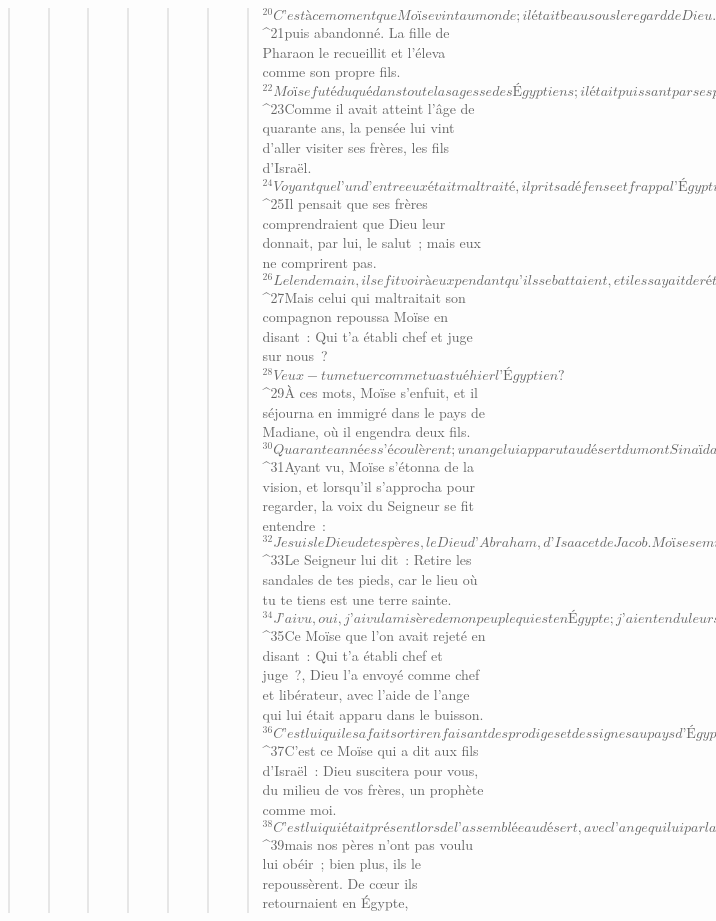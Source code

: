 \begin{verse}
\begin{verse}
\begin{verse}
\begin{verse}
\begin{verse}
\begin{verse}
\begin{verse}
${}^{20}C’est à ce moment que Moïse vint au monde ; il était beau sous le regard de Dieu. Il fut élevé pendant trois mois dans la maison de son père, 
${}^{21}puis abandonné. La fille de Pharaon le recueillit et l’éleva comme son propre fils. 
${}^{22}Moïse fut éduqué dans toute la sagesse des Égyptiens ; il était puissant par ses paroles et par ses actes. 
${}^{23}Comme il avait atteint l’âge de quarante ans, la pensée lui vint d’aller visiter ses frères, les fils d’Israël. 
${}^{24}Voyant que l’un d’entre eux était maltraité, il prit sa défense et frappa l’Égyptien pour venger celui qui était agressé. 
${}^{25}Il pensait que ses frères comprendraient que Dieu leur donnait, par lui, le salut ; mais eux ne comprirent pas. 
${}^{26}Le lendemain, il se fit voir à eux pendant qu’ils se battaient, et il essayait de rétablir la paix entre eux en leur disant : « Vous êtes frères : pourquoi vous faire du mal les uns aux autres ? » 
${}^{27}Mais celui qui maltraitait son compagnon repoussa Moïse en disant : Qui t’a établi chef et juge sur nous ? 
${}^{28}Veux-tu me tuer comme tu as tué hier l’Égyptien ? 
${}^{29}À ces mots, Moïse s’enfuit, et il séjourna en immigré dans le pays de Madiane, où il engendra deux fils.
${}^{30}Quarante années s’écoulèrent ; un ange lui apparut au désert du mont Sinaï dans la flamme d’un buisson en feu. 
${}^{31}Ayant vu, Moïse s’étonna de la vision, et lorsqu’il s’approcha pour regarder, la voix du Seigneur se fit entendre : 
${}^{32}Je suis le Dieu de tes pères, le Dieu d’Abraham, d’Isaac et de Jacob. Moïse se mit à trembler, et il n’osait plus regarder. 
${}^{33}Le Seigneur lui dit : Retire les sandales de tes pieds, car le lieu où tu te tiens est une terre sainte. 
${}^{34}J’ai vu, oui, j’ai vu la misère de mon peuple qui est en Égypte ; j’ai entendu leurs gémissements et je suis descendu pour les délivrer. Et maintenant, va ! Je t’envoie en Égypte.
${}^{35}Ce Moïse que l’on avait rejeté en disant : Qui t’a établi chef et juge ?, Dieu l’a envoyé comme chef et libérateur, avec l’aide de l’ange qui lui était apparu dans le buisson. 
${}^{36}C’est lui qui les a fait sortir en faisant des prodiges et des signes au pays d’Égypte, à la mer Rouge, et au désert pendant quarante ans. 
${}^{37}C’est ce Moïse qui a dit aux fils d’Israël : Dieu suscitera pour vous, du milieu de vos frères, un prophète comme moi. 
${}^{38}C’est lui qui était présent lors de l’assemblée au désert, avec l’ange qui lui parlait sur le mont Sinaï et avec nos pères : il reçut des paroles vivantes pour nous les donner, 
${}^{39}mais nos pères n’ont pas voulu lui obéir ; bien plus, ils le repoussèrent. De cœur ils retournaient en Égypte, 

\end{verse}
\end{verse}
\end{verse}
\end{verse}
\end{verse}
\end{verse}
\end{verse}
